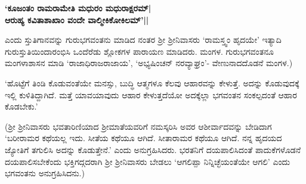 \begin{center} 

{\bf `ಕೂಜಂತಂ ರಾಮರಾಮೇತಿ ಮಧುರಂ ಮಧುರಾಕ್ಷರಮ್‍|\\ 

ಆರುಹ್ಯ ಕವಿತಾಶಾಖಾಂ ವಂದೇ ವಾಲ್ಮೀಕಿಕೋಕಿಲಮ್‍'||} 

\end{center} 


ಎಂದು ಸ್ತುತಿಗಾನವನ್ನು ಗುರುಭಗವಂತನು ಮಾಡಿದ ನಂತರ ಶ್ರೀ ಶ್ರೀನಿವಾಸರು `ರಾಮಸ್ತ್ವಂ ಹೃದಯೇ' ಇತ್ಯಾದಿ ಗುರುಸ್ತುತಿಯಿಂದಾರಂಭಿಸಿ ಒಂದೆರೆಡು ಶ್ಲೋಕಗಳ ಪಾರಾಯಣ ಮಾಡಿದರು. ಮಂಗಳ. ಗುರುಭಗವಂತನೂ ಮಂಗಳಾಶಾಸನ ಮಾಡಿ `ರಾಜಾಧಿರಾಜರಾಜಾಯ', `ಅಭ್ಯಷಿಂಚನ್‍ ನರವ್ಯಾಘ್ರಂ'- ವೇಣುನಾದದೊಡನೆ ಮಂಗಳ.) 


`ಹೊಟ್ಟೆಗೆ ತಿಂಡಿ ಕೊಡುವಂತೆಯೇ ಮನಸ್ಸು, ಬುದ್ಧಿ ಆತ್ಮಗಳೂ ಕೆಲವು ಆಹಾರವನ್ನು ಕೇಳುತ್ತೆ. ಅದನ್ನು ಕೊಡುವುದಕ್ಕೆ ಇಲ್ಲಿ ಕುಳಿತಿದ್ದಾಗಿದೆ. ಮತ್ತೆ ಯಾವಯಾವುದು ಆಹಾರ ಕೇಳುತ್ತದೆಯೋ ಅದಕ್ಕೆಲ್ಲಾ ಭಗವಂತನ ಸಂಕಲ್ಪದಂತೆ ಆಹಾರ ಕೊಡಬೇಕು.' 


(ಶ್ರೀ ಶ್ರೀನಿವಾಸರು ಭವತಾರಿಣಿಯಾದ ಶ್ರೀಮಾತೆಯವರಿಗೆ ನಮಸ್ಕರಿಸಿ ಅವರ ಆಶೀರ್ವಾದವನ್ನು ಬೇಡಿದಾಗ `ಬರೀರಾಮರ ಕಥೆಯಲ್ಲ ಇದು. ಸೀತೆಯ ಕಥೆಯೂ ಆಗಿದೆ. ಸೀತಾರಾಮರ ಕಥೆಯೂ ಆಗಿದೆ. ನನ್ನ ಹೃದಯದ ಜ್ಯೋತಿಗೆ ತಗುಲಿಸಿ ಅದನ್ನು ಕೊಡುತ್ತೇನೆ.' ಎಂದು ಅನುಗ್ರಹಿಸಿದರು. ಭರತನಿಗೆ ದಯಪಾಲಿಸಿದಂತೆ ಪಾದುಕೆಗಳೊಡನೆ ದಯಪಾಲಿಸಬೇಕೆಂದು ಭಕ್ತಿಗದ್ಗದರಾಗಿ ಶ್ರೀ ಶ್ರೀನಿವಾಸರು ಬೇಡಲು `ಆಗಲಿಪ್ಪಾ ನಿನ್ನಿಚ್ಛೆಯಂತೆಯೇ ಆಗಲಿ' ಎಂದು ಭಗವಂತನು ಅನುಗ್ರಹಿಸಿದನು.) 
